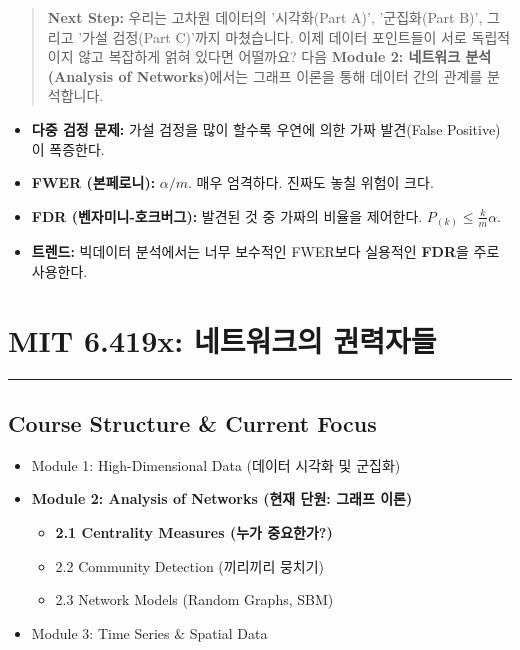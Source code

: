 \documentclass[11pt,a4paper]{book}
\theoremstyle{definition}
\begin{document}
\vspace{1cm}
\begin{quote}
\textbf{Next Step:} 우리는 고차원 데이터의 '시각화(Part A)', '군집화(Part B)', 그리고 '가설 검정(Part C)'까지 마쳤습니다. 이제 데이터 포인트들이 서로 독립적이지 않고 복잡하게 얽혀 있다면 어떨까요? 다음 \textbf{Module 2: 네트워크 분석 (Analysis of Networks)}에서는 그래프 이론을 통해 데이터 간의 관계를 분석합니다.
\end{quote}

\begin{summarybox}[title={Module 1 (Part C) 핵심 요약}]
\begin{itemize}
    \item \textbf{다중 검정 문제:} 가설 검정을 많이 할수록 우연에 의한 가짜 발견(False Positive)이 폭증한다.
    \item \textbf{FWER (본페로니):} $\alpha/m$. 매우 엄격하다. 진짜도 놓칠 위험이 크다.
    \item \textbf{FDR (벤자미니-호크버그):} 발견된 것 중 가짜의 비율을 제어한다. $P_{(k)} \le \frac{k}{m}\alpha$.
    \item \textbf{트렌드:} 빅데이터 분석에서는 너무 보수적인 FWER보다 실용적인 \textbf{FDR}을 주로 사용한다.
\end{itemize}
\end{summarybox}


\chapter{MIT 6.419x: 네트워크의 권력자들}
\label{ch:lecture4}


\vspace{1cm}
\hrule
\vspace{1cm}

\section*{Course Structure \& Current Focus}
\begin{itemize}
    \item Module 1: High-Dimensional Data (데이터 시각화 및 군집화)
    \item \textbf{\textcolor{mainblue}{Module 2: Analysis of Networks (현재 단원: 그래프 이론)}}
    \begin{itemize}
        \item \textbf{2.1 Centrality Measures (누가 중요한가?)}
        \item 2.2 Community Detection (끼리끼리 뭉치기)
        \item 2.3 Network Models (Random Graphs, SBM)
    \end{itemize}
    \item Module 3: Time Series \& Spatial Data
\end{itemize}
\end{document}
